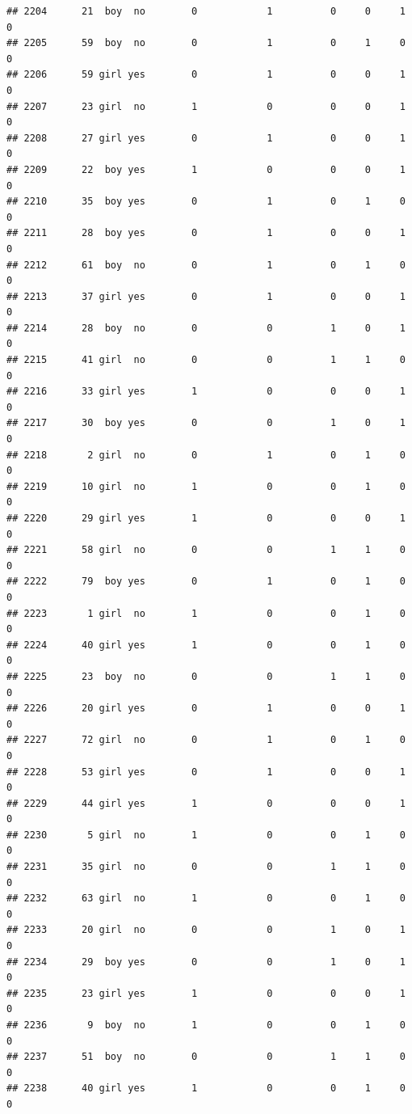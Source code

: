 \documentclass[man]{apa6}
\begin{document}
\begin{verbatim}
## 2204      21  boy  no        0            1          0     0     1     0
## 2205      59  boy  no        0            1          0     1     0     0
## 2206      59 girl yes        0            1          0     0     1     0
## 2207      23 girl  no        1            0          0     0     1     0
## 2208      27 girl yes        0            1          0     0     1     0
## 2209      22  boy yes        1            0          0     0     1     0
## 2210      35  boy yes        0            1          0     1     0     0
## 2211      28  boy yes        0            1          0     0     1     0
## 2212      61  boy  no        0            1          0     1     0     0
## 2213      37 girl yes        0            1          0     0     1     0
## 2214      28  boy  no        0            0          1     0     1     0
## 2215      41 girl  no        0            0          1     1     0     0
## 2216      33 girl yes        1            0          0     0     1     0
## 2217      30  boy yes        0            0          1     0     1     0
## 2218       2 girl  no        0            1          0     1     0     0
## 2219      10 girl  no        1            0          0     1     0     0
## 2220      29 girl yes        1            0          0     0     1     0
## 2221      58 girl  no        0            0          1     1     0     0
## 2222      79  boy yes        0            1          0     1     0     0
## 2223       1 girl  no        1            0          0     1     0     0
## 2224      40 girl yes        1            0          0     1     0     0
## 2225      23  boy  no        0            0          1     1     0     0
## 2226      20 girl yes        0            1          0     0     1     0
## 2227      72 girl  no        0            1          0     1     0     0
## 2228      53 girl yes        0            1          0     0     1     0
## 2229      44 girl yes        1            0          0     0     1     0
## 2230       5 girl  no        1            0          0     1     0     0
## 2231      35 girl  no        0            0          1     1     0     0
## 2232      63 girl  no        1            0          0     1     0     0
## 2233      20 girl  no        0            0          1     0     1     0
## 2234      29  boy yes        0            0          1     0     1     0
## 2235      23 girl yes        1            0          0     0     1     0
## 2236       9  boy  no        1            0          0     1     0     0
## 2237      51  boy  no        0            0          1     1     0     0
## 2238      40 girl yes        1            0          0     1     0     0

\end{verbatim}
\end{document}
